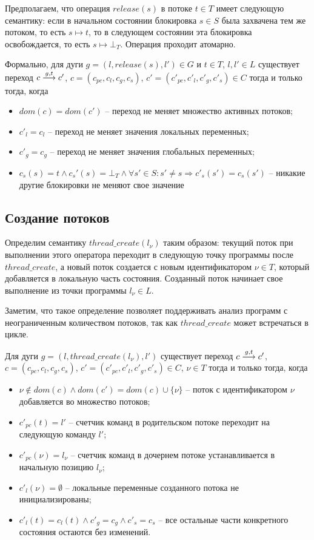 Предполагаем, что операция $release(s)$ в потоке $t \in T$ имеет следующую семантику:
если в начальном состоянии блокировка $s \in S$ была захвачена тем же потоком, то есть $s \mapsto t$, то в следующем состоянии эта блокировка освобождается, то есть $s \mapsto \bot_T$. Операция проходит атомарно.

Формально, для дуги $g = (l, release(s), l')\in G$ и $t\in T$, $l, l' \in L$ существует переход
$c \stackrel{g, t}{\longrightarrow} c'$, $c=(c_{pc}, c_l, c_g, c_s)$, $c'=(c'_{pc}, c'_l, c'_g, c'_s) \in C$ тогда и только тогда, когда 
\begin{itemize}
\item $dom(c)=dom(c')$ -- переход не меняет множество активных потоков;
\item $c'_l=c_l$ -- переход не меняет значения локальных переменных;
\item $c'_g = c_g$ -- переход не меняет значения глобальных переменных;
\item $c_s(s)=t \land c_s'(s)=\bot_T \land \forall s'\in S: s'\neq s \Rightarrow c'_s(s')=c_s(s')$ -- никакие другие блокировки не меняют свое значение
\end{itemize}

\subsection{Создание потоков}
Определим семантику $thread\_create(l_\nu)$ таким образом: текущий поток при выполнении этого оператора переходит в следующую точку программы после $thread\_create$, а новый поток создается с новым идентификатором $\nu \in T$, который добавляется в локальную часть состояния.
Созданный поток начинает свое выполнение из точки программы $l_\nu \in L$.

Заметим, что такое определение позволяет поддерживать анализ программ с неограниченным количеством потоков, так как $thread\_create$ может встречаться в цикле.

Для дуги $g = (l, thread\_create(l_\nu), l')$ существует переход
$c \stackrel{g, t}{\longrightarrow} c'$, $c=(c_{pc}, c_l, c_g, c_s)$, $c'=(c'_{pc}, c'_l, c'_g, c'_s) \in C$, $\nu \in T$ тогда и только тогда, когда
\begin{itemize}
\item $\nu \notin dom(c) \land dom(c') = dom(c) \cup \{ \nu\}$ -- поток с идентификатором $\nu$ добавляется во множество потоков;
\item $c'_{pc}(t)=l'$ -- счетчик команд в родительском потоке переходит на следующую команду $l'$;
\item $c'_{pc}(\nu)=l_\nu$ --  счетчик команд в дочернем потоке устанавливается в начальную позицию $l_\nu$;
\item $c'_l(\nu)=\emptyset$ -- локальные переменные созданного потока не инициализированы;
\item $c'_l(t)=c_l(t) \land c'_g = c_g \land c'_s = c_s$ -- все остальные части конкретного состояния остаются без изменений.
\end{itemize}

